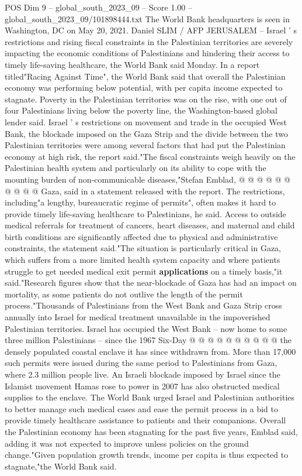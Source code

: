 \begin{textsample}{POS Dim 9 – global\_south\_2023\_09 – Score 1.00 – global\_south\_2023\_09/101898444.txt}  \label{ex:f9_pos_004}
The World Bank headquarters is seen in Washington, DC on May 20, 2021.
Daniel SLIM / AFP JERUSALEM -- Israel ' s restrictions and rising fiscal constraints in the Palestinian territories are severely impacting the economic conditions of Palestinians and hindering their access to timely life-saving healthcare, the World Bank said Monday.
In a report titled"Racing Against Time", the World Bank said that overall the Palestinian economy was performing below potential, with per capita income expected to stagnate.
Poverty in the Palestinian territories was on the rise, with one out of four Palestinians living below the poverty line, the Washington-based global lender said.
Israel ' s restrictions on movement and trade in the occupied West Bank, the blockade imposed on the Gaza Strip and the divide between the two Palestinian territories were among several factors that had put the Palestinian economy at high risk, the report said."The fiscal constraints weigh heavily on the Palestinian health system and particularly on its ability to cope with the mounting burden of non-communicable diseases,"Stefan Emblad, @ @ @ @ @ @ @ @ @ @ Gaza, said in a statement released with the report.
The restrictions, including"a lengthy, bureaucratic regime of permits", often makes it hard to provide timely life-saving healthcare to Palestinians, he said.
Access to outside medical referrals for treatment of cancers, heart diseases, and maternal and child birth conditions are significantly affected due to physical and administrative constraints, the statement said."The situation is particularly critical in Gaza, which suffers from a more limited health system capacity and where patients struggle to get needed medical exit permit \textbf{applications} on a timely basis,"it said."Research figures show that the near-blockade of Gaza has had an impact on mortality, as some patients do not outlive the length of the permit process."Thousands of Palestinians from the West Bank and Gaza Strip cross annually into Israel for medical treatment unavailable in the impoverished Palestinian territories.
Israel has occupied the West Bank -- now home to some three million Palestinians -- since the 1967 Six-Day @ @ @ @ @ @ @ @ @ @ the densely populated coastal enclave it has since withdrawn from.
More than 17,000 such permits were issued during the same period to Palestinians from Gaza, where 2.3 million people live.
An Israeli blockade imposed by Israel since the Islamist movement Hamas rose to power in 2007 has also obstructed medical supplies to the enclave.
The World Bank urged Israel and Palestinian authorities to better manage such medical cases and ease the permit process in a bid to provide timely healthcare assistance to patients and their companions.
Overall the Palestinian economy has been stagnating for the past five years, Emblad said, adding it was not expected to improve unless policies on the ground change."Given population growth trends, income per capita is thus expected to stagnate,"the World Bank said.

\end{textsample}
